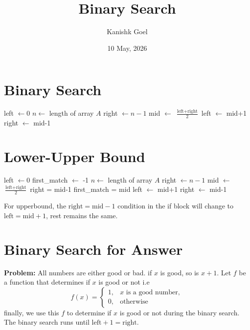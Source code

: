 \documentclass{article}
\title{Binary Search}
\author{Kanishk Goel}
\date{10 May, 2026}
\begin{document}
	\SetAlgoCaptionSeparator{}
	\renewcommand{\thealgocf}{} 
	\renewcommand{\AlCapNameFnt}{\bfseries}
	\renewcommand{\AlCapFnt}{}
	\DontPrintSemicolon
	\renewcommand{\algorithmcfname}{}
	\maketitle
	\SetAlgoNoEnd
	\section{Binary Search}
	\begin{algorithm}[H]
		\SetAlgoLined
		\caption{Binary Search}
		left $\leftarrow 0$ \;
		$n \leftarrow$ length of array $A$ \;
		right $\leftarrow n-1$ \;
		{
			mid $\leftarrow$ $\frac{\text{left} + \text{right}}{2}$ \;
			{
				 \;
			}
			{
				left $\leftarrow$ mid+1 \;
			}
			\Else
			{
				right $\leftarrow$ mid-1 \;
			}
		}
		 \;
	\end{algorithm}	
	\vspace{5mm}
	\section{Lower-Upper Bound}
	\begin{algorithm}[H]
		\SetAlgoLined
		\caption{Lower Bound}
		left $\leftarrow 0$ \;
		first\_match $\leftarrow$ -1 \;
		$n \leftarrow$ length of array $A$ \;
		right $\leftarrow n-1$ \;
		{
			mid $\leftarrow$ $\frac{\text{left} + \text{right}}{2}$ \;
			{
				right = mid-1\;
				first\_match = mid \;
			}
			{
				left $\leftarrow$ mid+1 \;
			}
			\Else
			{
				right $\leftarrow$ mid-1 \;
			}
		}
		 \;
	\end{algorithm}
	\vspace{3mm}
	For upperbound, the $\text{right} = \text{mid}-1$ condition in the if block will change to $\text{left} = \text{mid}+1$, rest remains the same.
	
	\section{Binary Search for Answer}
	\textbf{Problem:} All numbers are either good or bad. if $x$ is good, so is $x+1$. Let $f$ be a function that determines if $x$ is good or not i.e 
	\[
	f(x)=
	\begin{cases}
		1, & x \text{ is a good number}, \\
		0, & \text{otherwise}
	\end{cases}
	\]
	finally, we use this $f$ to determine if $x$ is good or not during the binary search. The binary search runs until $\text{left} + 1 = \text{right}$. \newline
	
\end{document}
